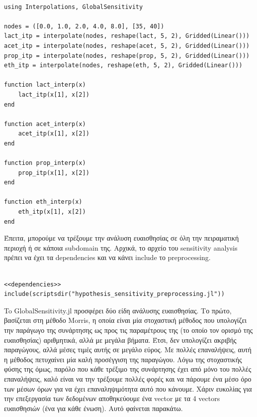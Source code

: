 \documentclass[11pt]{article}
\begin{document}
\begin{verbatim}

using Interpolations, GlobalSensitivity

nodes = ([0.0, 1.0, 2.0, 4.0, 8.0], [35, 40])
lact_itp = interpolate(nodes, reshape(lact, 5, 2), Gridded(Linear()))
acet_itp = interpolate(nodes, reshape(acet, 5, 2), Gridded(Linear()))
prop_itp = interpolate(nodes, reshape(prop, 5, 2), Gridded(Linear()))
eth_itp = interpolate(nodes, reshape(eth, 5, 2), Gridded(Linear()))

function lact_interp(x)
    lact_itp(x[1], x[2])
end

function acet_interp(x)
    acet_itp(x[1], x[2])
end

function prop_interp(x)
    prop_itp(x[1], x[2])
end

function eth_interp(x)
    eth_itp(x[1], x[2])
end

\end{verbatim}

Έπειτα, μπορούμε να τρέξουμε την ανάλυση ευαισθησίας σε όλη την πειραματική περιοχή ή σε κάποια subdomain της. Αρχικά, το αρχείο του sensitivity analysis πρέπει να έχει τα dependencies και να κάνει include το preprocessing.

\begin{verbatim}

<<dependencies>>
include(scriptsdir("hypothesis_sensitivity_preprocessing.jl"))

\end{verbatim}

To GlobalSensitivity.jl προσφέρει δύο είδη ανάλυσης ευαισθησίας. Το πρώτο, βασίζεται στη μέθοδο Morris, η οποία είναι μία στοχαστική μέθοδος που υπολογίζει την παράγωγο της συνάρτησης ως προς τις παραμέτρους της (το οποίο τον ορισμό της ευαισθησίας) αριθμητικά, αλλά με μεγάλα βήματα. Έτσι, δεν υπολογίζει ακριβής παραγώγους, αλλά μέσες τιμές αυτής σε μεγάλο εύρος. Με πολλές επαναλήψεις, αυτή η μέθοδος πετυχαίνει μία καλή προσέγγιση της παραγώγου. Λόγω της στοχαστικής φύσης της όμως, παρόλο που κάθε τρέξιμο της συνάρτησης έχει από μόνο του πολλές επαναλήψεις, καλό είναι να την τρέξουμε πολλές φορές και να πάρουμε ένα μέσο όρο των μέσων όρων για να έχει επαναληψιμότητα αυτό που κάνουμε. Χάριν ευκολίας για την επεξεργασία των δεδομένων αποθηκεύουμε ένα vector με τα 4 vectors ευαισθησιών (ένα για κάθε ένωση). Αυτό φαίνεται παρακάτω.
\end{document}
